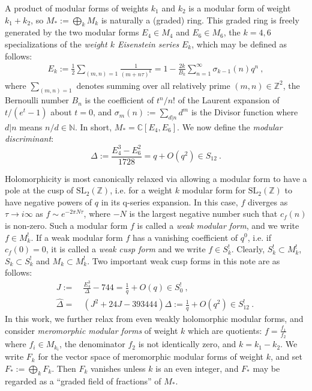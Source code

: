 \documentclass[11pt]{article}
\newcommand{\ZZ}{\mathbb{Z}}
\newcommand{\CC}{\mathbb{C}}
\newcommand{\NN}{\mathbb{N}}
\newcommand{\SLZ}{\mathrm{SL}_2(\ZZ)}
\newcommand{\Dhat}{\widehat{\Delta}}
\begin{document}
A product of modular forms of weights $k_1$ and $k_2$ is a modular form of weight 
$k_1+k_2$, so $M_*:=\bigoplus_k  M_k$ is naturally a (graded) ring. This graded ring is 
freely generated by the two modular forms $E_4 \in M_4$ and $E_6 \in M_6$, the $k = 4, 6$
specializations of the {\em weight $k$ Eisenstein series} $E_k$, which may be defined as follows:
\begin{align}
E_k := \frac{1}{2}\sum_{(m,n)=1} \frac{1}{(m+n\tau)^k} = 1 - \frac{2k}{B_k}\sum_{n = 1}^{\infty} \sigma_{k-1}(n) q^n~,
\end{align}
where $\sum_{(m,n) = 1}$ denotes summing over all relatively prime $(m,n) \in \ZZ^2$, the Bernoulli 
number $B_n$ is the coefficient of $t^n/n!$ of the Laurent expansion of $t/(e^{t}-1)$ about $t = 0$, 
and $\sigma_m(n) := \sum_{d|n} d^m$ is the Divisor function where $d|n$ means $n/d \in \NN$. 
In short, $M_* = \CC[E_4, E_6]$. We now define the {\em modular discriminant}:
\begin{equation}
\Delta := \frac{E_4^3-E_6^2}{1728} = q + O(q^2) \in S_{12}~.
\end{equation}

Holomorphicity is most canonically relaxed via allowing a modular form to have a pole at the 
cusp of $\SLZ$, i.e. for a weight $k$ modular form for $\SLZ$ to have negative powers of $q$ 
in its q-series expansion. In this case, $f$ diverges as $\tau \to i \infty$ as $f \sim e^{-2 \pi N \tau}$, 
where $-N$ is the largest negative number such that $c_f(n)$ is non-zero. Such a modular form 
$f$ is called a {\em weak modular form}, and we write $f \in M_k^!$. If a weak modular form $f$ 
has a vanishing coefficient of $q^0$, i.e. if $c_f(0) = 0$, it is called a {\em weak cusp form} and 
we write $f \in S_k^!$. Clearly, $S_k^! \subset M_k^!$, $S_k \subset S_k^!$ and $M_k \subset M_k^!$. 
Two important weak cusp forms in this note are as follows: 
\begin{align}
J :=&~ \frac{E_4^3}{\Delta} - 744 = \frac{1}{q} + O(q) \in S_0^!~,~\\
\Dhat =&~ (J^2 + 24 J -393444) \Delta := \frac{1}{q} + O(q^2) \in S_{12}^!~.~
\end{align}
In this work, we further relax from even weakly holomorphic modular forms, and 
consider {\em meromorphic modular forms} of weight $k$ which are quotients: $f=\frac{f_1}{f_2}$ 
where $f_i\in M_{k_i}$, the denominator $f_2$ is not identically zero, and $k=k_1-k_2$. We 
write $F_k$ for the vector space of meromorphic modular forms of weight $k$, and set 
$F_*:=\bigoplus_k F_k$. Then $F_k$ vanishes unless $k$ is an even integer, and 
$F_*$ may be regarded as a ``graded field of fractions'' of $M_*$. 
\end{document}
